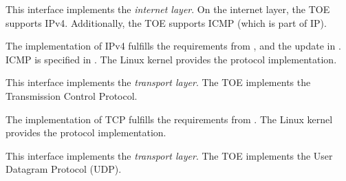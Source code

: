 



This interface implements the \emph{internet layer}. On the internet layer, the
TOE supports IPv4. Additionally, the TOE supports ICMP (which is part of IP).





The implementation of IPv4 fulfills the requirements from ,
 and the update in . ICMP is specified in
. The Linux kernel provides the protocol implementation.






This interface implements the \emph{transport layer}. The TOE implements the
Transmission Control Protocol.





The implementation of TCP fulfills the requirements from . The Linux
kernel provides the protocol implementation.






This interface implements the \emph{transport layer}. The TOE implements the
User Datagram Protocol (UDP).





